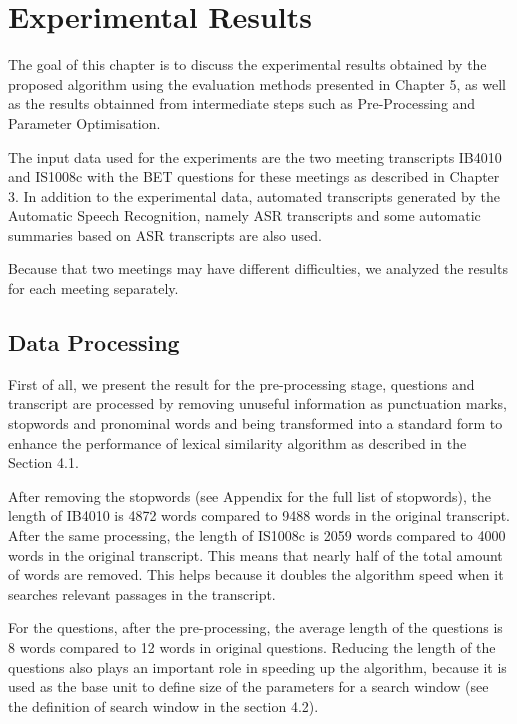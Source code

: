 \chapter{Experimental Results}
The goal of this chapter is to discuss the experimental results obtained by the proposed algorithm using the evaluation methods  presented in  Chapter 5, as well as the results obtainned from intermediate steps such as Pre-Processing and Parameter Optimisation. 

The input data used for the experiments are the two meeting transcripts IB4010 and IS1008c with the BET questions for these meetings as described in Chapter 3. In addition to the experimental data, automated transcripts generated by the Automatic Speech Recognition, namely ASR transcripts and some automatic summaries based on ASR transcripts are also used. 

Because that two meetings may have different difficulties, we analyzed the results for each meeting separately.

\section{Data Processing}


First of all, we present the result for the pre-processing stage, questions and transcript are processed by removing unuseful information as punctuation marks, stopwords and pronominal words and being transformed into a standard form to enhance the performance of lexical similarity algorithm as described in the Section 4.1.

After removing the stopwords (see Appendix for the full list of stopwords), the length of IB4010 is 4872 words compared to 9488 words in the original transcript. After the same processing, the length of IS1008c is 2059 words compared to 4000 words in the original transcript. This means that nearly half of the total amount of words are removed. This helps because it doubles the algorithm speed when it searches relevant passages in the transcript.

For the questions, after the pre-processing, the average length of the questions is 8 words compared to 12 words in original questions. Reducing the length of the questions also plays an important role in speeding up the algorithm, because it is used as the base unit to define size of the parameters for a search window (see the definition of search window in the section 4.2).


